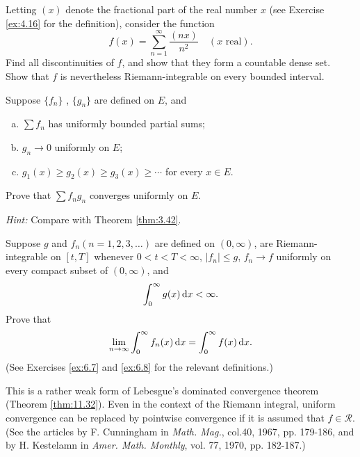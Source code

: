 \begin{myExercise}
    \label{ex:7.10}
    Letting $(x)$ denote the fractional part of the real number $x$
    (see Exercise \ref{ex:4.16} for the definition),
    consider the function
    \begin{equation*}
        f(x) = \sum_{n=1}^{\infty} \frac{(nx)}{n^2} \quad 
        (x \text{ real}).
    \end{equation*}
    Find all discontinuities of $f$,
    and show that they form a countable dense set.
    Show that $f$ is nevertheless Riemann-integrable on every bounded interval.
\end{myExercise}


\begin{myExercise}
    \label{ex:7.11}
    Suppose $\{f_n\}$ , $\{g_n\}$ are defined on $E$, and 
    \begin{enumerate}[(a)]
        \item $\sum f_n$ has uniformly bounded partial sums;
        \item $g_n \rightarrow 0$ uniformly on $E$;
        \item $g_1(x) \geq g_2(x) \geq g_3(x) \geq \cdots$ for every $x \in E$.
    \end{enumerate}
    
    Prove that $\sum f_n g_n$ converges uniformly on $E$.

    \emph{Hint:} Compare with Theorem \ref{thm:3.42}.
\end{myExercise}


\begin{myExercise}
    \label{ex:7.12}
    Suppose $g$ and $f_n(n=1,2,3,\dots)$ are defined on $(0,\infty)$, are Riemann-integrable on $[t,T]$ whenever $0 < t < T < \infty$, $|f_n| \leq g$, $f_n \rightarrow f$ uniformly on every compact subset of $(0, \infty)$, and 
    \begin{equation*}
        \int_{0}^{\infty} g(x) \d x < \infty .
    \end{equation*}
    Prove that 
    \begin{equation*}
        \lim_{n \to \infty} \int_{0}^{\infty} f_n (x) \d x = 
        \int_{0}^{\infty} f(x) \d x .
    \end{equation*}
    (See Exercises \ref{ex:6.7} and \ref{ex:6.8} for the relevant definitions.)

    This is a rather weak form of Lebesgue's dominated convergence theorem (Theorem \ref{thm:11.32}).
    Even in the context of the Riemann integral, uniform convergence can be replaced by pointwise convergence if it is assumed that $f \in \mathscr{R}$.
    (See the articles by F. Cunningham in \emph{Math. Mag.}, col.40, 1967, pp. 179-186, and by H. Kestelamn in \emph{Amer. Math. Monthly}, vol. 77, 1970, pp. 182-187.)
\end{myExercise}


